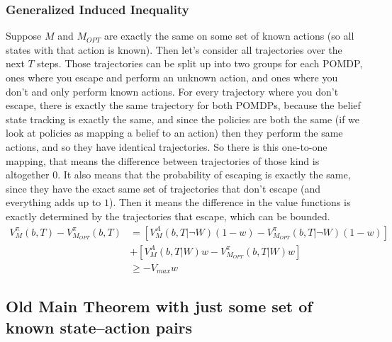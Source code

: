 \documentclass[10pt,english]{article}
\begin{document}
\subsubsection{Generalized Induced Inequality}
Suppose $M$ and $M_{OPT}$ are exactly the same on some set of known actions (so all states with that action is known). Then let's consider all trajectories over the next $T$ steps. Those trajectories can be split up into two groups for each POMDP, ones where you escape and perform an unknown action, and ones where you don't and only perform known actions. For every trajectory where you don't escape, there is exactly the same trajectory for both POMDPs, because the belief state tracking is exactly the same, and since the policies are both the same (if we look at policies as mapping a belief to an action) then they perform the same actions, and so they have identical trajectories. So there is this one-to-one mapping, that means the difference between trajectories of those kind is altogether $0$. It also means that the probability of escaping is exactly the same, since they have the exact same set of trajectories that don't escape (and everything adds up to $1$). Then it means the difference in the value functions is exactly determined by the trajectories that escape, which can be bounded.
\begin{align}
V^{\pi}_M(b,T) - V^{\pi}_{M_{OPT}}(b,T) &= [V^A_M(b,T|\neg W)(1-w) - V^{\pi}_{M_{OPT}}(b,T|\neg W)(1-w)] \\
& + [V^A_M(b,T|W)w - V^{\pi}_{M_{OPT}}(b,T|W)w]\\
&\geq -V_{max}w
\end{align}

\subsection{Old Main Theorem with just some set of known state--action pairs}
\end{document}
